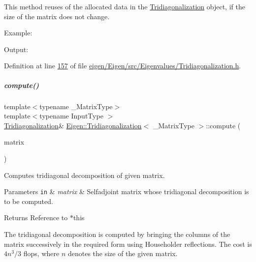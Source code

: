 This method reuses of the allocated data in the \hyperlink{group___eigenvalues___module_class_eigen_1_1_tridiagonalization}{Tridiagonalization} object, if the size of the matrix does not change.

Example\+: 
\begin{DoxyCodeInclude}
\end{DoxyCodeInclude}
 Output\+: 
\begin{DoxyVerbInclude}
\end{DoxyVerbInclude}
 

Definition at line \hyperlink{eigen_2_eigen_2src_2_eigenvalues_2_tridiagonalization_8h_source_l00157}{157} of file \hyperlink{eigen_2_eigen_2src_2_eigenvalues_2_tridiagonalization_8h_source}{eigen/\+Eigen/src/\+Eigenvalues/\+Tridiagonalization.\+h}.

\mbox{\label{group___eigenvalues___module_acd288abb081d3b40b87e4b98cd8f6ee9}} 
\subparagraph{\texorpdfstring{compute()}{compute()}\hspace{0.1cm}{\footnotesize\ttfamily [2/2]}}
{\footnotesize\ttfamily template$<$typename \+\_\+\+Matrix\+Type$>$ \\
template$<$typename Input\+Type $>$ \\
\hyperlink{group___eigenvalues___module_class_eigen_1_1_tridiagonalization}{Tridiagonalization}\& \hyperlink{group___eigenvalues___module_class_eigen_1_1_tridiagonalization}{Eigen\+::\+Tridiagonalization}$<$ \+\_\+\+Matrix\+Type $>$\+::compute (\begin{DoxyParamCaption}\item[{const \hyperlink{group___core___module_struct_eigen_1_1_eigen_base}{Eigen\+Base}$<$ Input\+Type $>$ \&}]{matrix }\end{DoxyParamCaption})\hspace{0.3cm}{\ttfamily [inline]}}



Computes tridiagonal decomposition of given matrix. 


\begin{DoxyParams}[1]{Parameters}
\mbox{\tt in}  & {\em matrix} & Selfadjoint matrix whose tridiagonal decomposition is to be computed. \\
\hline
\end{DoxyParams}
\begin{DoxyReturn}{Returns}
Reference to {\ttfamily $\ast$this} 
\end{DoxyReturn}
The tridiagonal decomposition is computed by bringing the columns of the matrix successively in the required form using Householder reflections. The cost is $ 4n^3/3 $ flops, where $ n $ denotes the size of the given matrix.

